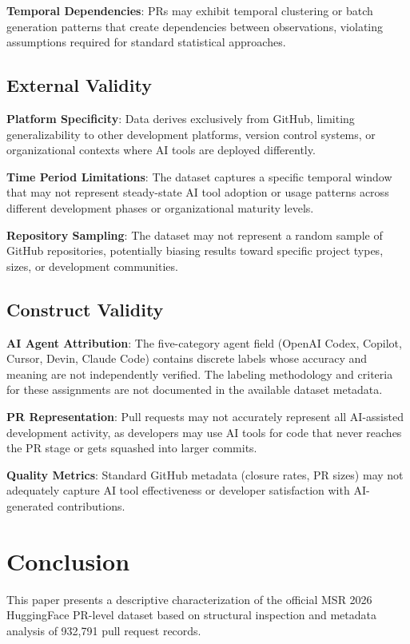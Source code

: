 \documentclass[conference]{IEEEtran}
\begin{document}
\textbf{Temporal Dependencies}: PRs may exhibit temporal clustering or batch generation patterns that create dependencies between observations, violating assumptions required for standard statistical approaches.

\subsection{External Validity}

\textbf{Platform Specificity}: Data derives exclusively from GitHub, limiting generalizability to other development platforms, version control systems, or organizational contexts where AI tools are deployed differently.

\textbf{Time Period Limitations}: The dataset captures a specific temporal window that may not represent steady-state AI tool adoption or usage patterns across different development phases or organizational maturity levels.

\textbf{Repository Sampling}: The dataset may not represent a random sample of GitHub repositories, potentially biasing results toward specific project types, sizes, or development communities.

\subsection{Construct Validity}

\textbf{AI Agent Attribution}: The five-category agent field (OpenAI Codex, Copilot, Cursor, Devin, Claude Code) contains discrete labels whose accuracy and meaning are not independently verified. The labeling methodology and criteria for these assignments are not documented in the available dataset metadata.

\textbf{PR Representation}: Pull requests may not accurately represent all AI-assisted development activity, as developers may use AI tools for code that never reaches the PR stage or gets squashed into larger commits.

\textbf{Quality Metrics}: Standard GitHub metadata (closure rates, PR sizes) may not adequately capture AI tool effectiveness or developer satisfaction with AI-generated contributions.

\section{Conclusion}

This paper presents a descriptive characterization of the official MSR 2026 HuggingFace PR-level dataset based on structural inspection and metadata analysis of 932,791 pull request records.
\end{document}
